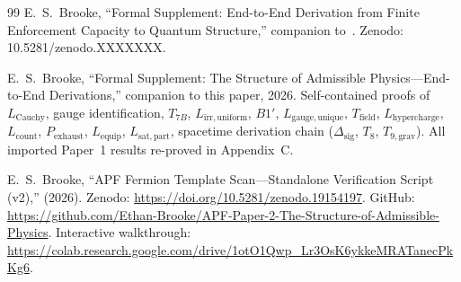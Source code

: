 \documentclass[11pt]{article}
\begin{document}
\begin{thebibliography}{99}
 E.~S.~Brooke, ``Formal Supplement: End-to-End Derivation from Finite Enforcement Capacity to Quantum Structure,'' companion to~\cite{BrookePaper1}.  Zenodo: 10.5281/zenodo.XXXXXXX.

 E.~S.~Brooke, ``Formal Supplement: The Structure of Admissible Physics---End-to-End Derivations,'' companion to this paper, 2026.  Self-contained proofs of $L_{\mathrm{Cauchy}}$, gauge identification, $T_{7B}$, $L_{\mathrm{irr,uniform}}$, $B1'$, $L_{\mathrm{gauge,unique}}$, $T_{\mathrm{field}}$, $L_{\mathrm{hypercharge}}$, $L_{\mathrm{count}}$, $P_{\mathrm{exhaust}}$, $L_{\mathrm{equip}}$, $L_{\mathrm{sat,part}}$, spacetime derivation chain ($\Delta_{\mathrm{sig}}$, $T_8$, $T_{9,\mathrm{grav}}$).  All imported Paper~1 results re-proved in Appendix~C.

 E.~S.~Brooke, ``APF Fermion Template Scan---Standalone Verification Script (v2),'' (2026).  Zenodo: \url{https://doi.org/10.5281/zenodo.19154197}.  GitHub: \url{https://github.com/Ethan-Brooke/APF-Paper-2-The-Structure-of-Admissible-Physics}.  Interactive walkthrough: \url{https://colab.research.google.com/drive/1otO1Qwp_Lr3OsK6ykkeMRATanecPkKg6}.

\end{thebibliography}
\end{document}

